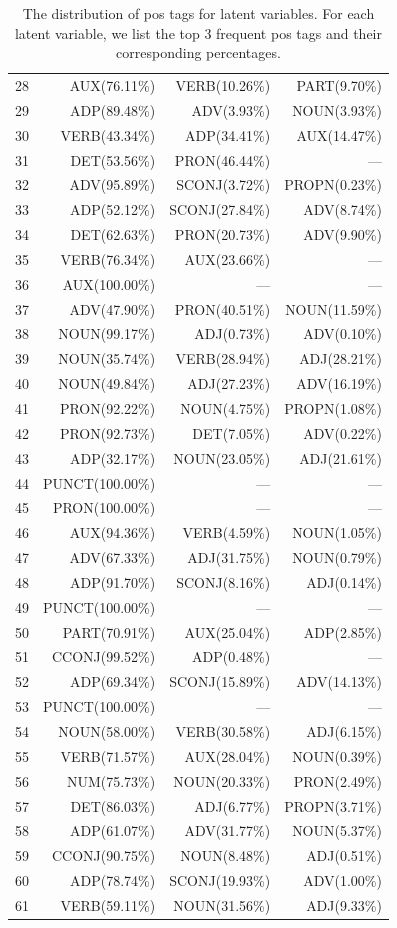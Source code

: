\begin{table}[htbp]
\begin{tabular}{lrrr}
28& AUX(76.11\%)& VERB(10.26\%)& PART(9.70\%)\\
29& ADP(89.48\%)& ADV(3.93\%)& NOUN(3.93\%)\\
30& VERB(43.34\%)& ADP(34.41\%)& AUX(14.47\%)\\
31& DET(53.56\%)& PRON(46.44\%)& ---\\
32& ADV(95.89\%)& SCONJ(3.72\%)& PROPN(0.23\%)\\
33& ADP(52.12\%)& SCONJ(27.84\%)& ADV(8.74\%)\\
34& DET(62.63\%)& PRON(20.73\%)& ADV(9.90\%)\\
35& VERB(76.34\%)& AUX(23.66\%)& ---\\
36& AUX(100.00\%)& ---& ---\\
37& ADV(47.90\%)& PRON(40.51\%)& NOUN(11.59\%)\\
38& NOUN(99.17\%)& ADJ(0.73\%)& ADV(0.10\%)\\
39& NOUN(35.74\%)& VERB(28.94\%)& ADJ(28.21\%)\\
40& NOUN(49.84\%)& ADJ(27.23\%)& ADV(16.19\%)\\
41& PRON(92.22\%)& NOUN(4.75\%)& PROPN(1.08\%)\\
42& PRON(92.73\%)& DET(7.05\%)& ADV(0.22\%)\\
43& ADP(32.17\%)& NOUN(23.05\%)& ADJ(21.61\%)\\
44& PUNCT(100.00\%)& ---& ---\\
45& PRON(100.00\%)& ---& ---\\
46& AUX(94.36\%)& VERB(4.59\%)& NOUN(1.05\%)\\
47& ADV(67.33\%)& ADJ(31.75\%)& NOUN(0.79\%)\\
48& ADP(91.70\%)& SCONJ(8.16\%)& ADJ(0.14\%)\\
49& PUNCT(100.00\%)& ---& ---\\
50& PART(70.91\%)& AUX(25.04\%)& ADP(2.85\%)\\
51& CCONJ(99.52\%)& ADP(0.48\%)& ---\\
52& ADP(69.34\%)& SCONJ(15.89\%)& ADV(14.13\%)\\
53& PUNCT(100.00\%)& ---& ---\\
54& NOUN(58.00\%)& VERB(30.58\%)& ADJ(6.15\%)\\
55& VERB(71.57\%)& AUX(28.04\%)& NOUN(0.39\%)\\
56& NUM(75.73\%)& NOUN(20.33\%)& PRON(2.49\%)\\
57& DET(86.03\%)& ADJ(6.77\%)& PROPN(3.71\%)\\
58& ADP(61.07\%)& ADV(31.77\%)& NOUN(5.37\%)\\
59& CCONJ(90.75\%)& NOUN(8.48\%)& ADJ(0.51\%)\\
60& ADP(78.74\%)& SCONJ(19.93\%)& ADV(1.00\%)\\
61& VERB(59.11\%)& NOUN(31.56\%)& ADJ(9.33\%)\\ 
\bottomrule
\end{tabular}
\caption{The distribution of pos tags for latent variables. For each latent variable, we list the top 3 frequent pos tags and their corresponding percentages. }
\end{table}

